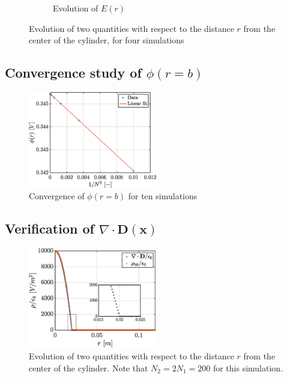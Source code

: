 \documentclass[a4paper,12pt,twoside]{article}
\newcommand{\mbf}[1]{\mathbf{#1}} %
\newcommand{\Div}[1]{\nabla\cdot\mathbf{#1}}
\newcommand{\bracket}[1]{\left(#1\right)}
\begin{document}
\begin{figure}[h]
\begin{subfigure}{0.45\textwidth}
      \caption{Evolution of $E(r)$}
      \label{fig:d1-evoEr}
    \end{subfigure}
    \caption{Evolution of two quantities with respect to the distance $r$ from the center of the cylinder, for four simulations}
    \label{fig:d1-evo}
  \end{figure}

  \subsection{Convergence study of $\phi\bracket{r=b}$} \lipsum[1-1]

  \begin{figure}[h]
    \centering
    \includegraphics[width=0.5\textwidth]{graphs/exd1-convPhi.eps}
    \caption{Convergence of $\phi\bracket{r=b}$ for ten simulations}
    \label{fig:d1-conv}
  \end{figure}

  \subsection{Verification of $\Div{\mbf{D}\bracket{\mbf{x}}}$} \lipsum[1-1]

  \begin{figure}[h]
    \centering
    \includegraphics[width=0.5\textwidth]{graphs/exd2-diff.eps}
    \caption{Evolution of two quantities with respect to the distance $r$ from the center of the cylinder. Note that $N_2=2N_1=200$ for this simulation.} %
    \label{fig:d2}
  \end{figure}
\end{document}
